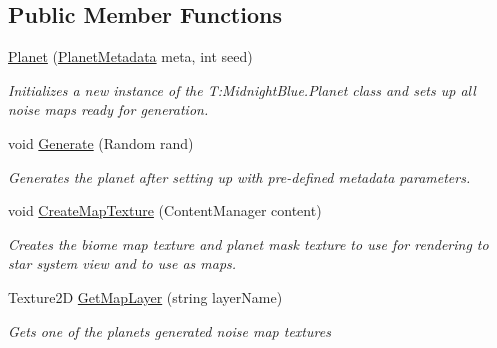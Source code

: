 \subsection*{Public Member Functions}
\begin{DoxyCompactItemize}
\item 
\hyperlink{class_midnight_blue_1_1_planet_a649f87901a50e64a6423438504e468a4}{Planet} (\hyperlink{class_midnight_blue_1_1_planet_metadata}{Planet\+Metadata} meta, int seed)
\begin{DoxyCompactList}\small\item\em Initializes a new instance of the T\+:\+Midnight\+Blue.\+Planet class and sets up all noise maps ready for generation. \end{DoxyCompactList}\item 
void \hyperlink{class_midnight_blue_1_1_planet_ac7264aea3a992afb4cab0ad99c96dbb8}{Generate} (Random rand)
\begin{DoxyCompactList}\small\item\em Generates the planet after setting up with pre-\/defined metadata parameters. \end{DoxyCompactList}\item 
void \hyperlink{class_midnight_blue_1_1_planet_ae39b013905369f01902b4f28d4fc031e}{Create\+Map\+Texture} (Content\+Manager content)
\begin{DoxyCompactList}\small\item\em Creates the biome map texture and planet mask texture to use for rendering to star system view and to use as maps. \end{DoxyCompactList}\item 
Texture2D \hyperlink{class_midnight_blue_1_1_planet_ac3b3442ad8f168a8d9151386592eb270}{Get\+Map\+Layer} (string layer\+Name)
\begin{DoxyCompactList}\small\item\em Gets one of the planets generated noise map textures \end{DoxyCompactList}\end{DoxyCompactItemize}
